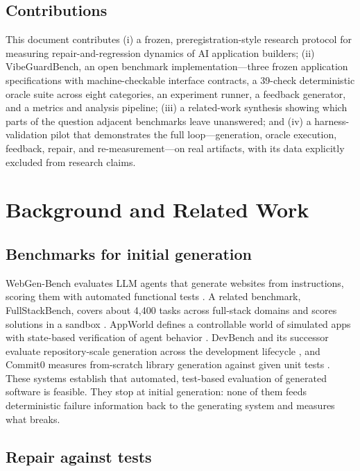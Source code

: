 \subsection{Contributions}

This document contributes (i) a frozen, preregistration-style research protocol for
measuring repair-and-regression dynamics of AI application builders; (ii) VibeGuardBench,
an open benchmark implementation---three frozen application specifications with
machine-checkable interface contracts, a 39-check deterministic oracle suite across
eight categories, an experiment runner, a feedback generator, and a metrics and
analysis pipeline; (iii) a related-work synthesis showing which parts of the question
adjacent benchmarks leave unanswered; and (iv) a harness-validation pilot that
demonstrates the full loop---generation, oracle execution, feedback, repair, and
re-measurement---on real artifacts, with its data explicitly excluded from research
claims.

\section{Background and Related Work}

\subsection{Benchmarks for initial generation}

WebGen-Bench evaluates LLM agents that generate websites from instructions, scoring
them with automated functional tests \cite{lu2025webgen}. A related benchmark,
FullStackBench, covers about
4{,}400 tasks across full-stack domains and scores solutions in a sandbox
\cite{byte2025fullstack}. AppWorld defines a controllable world of simulated apps
with state-based verification of agent behavior \cite{trivedi2024appworld}. DevBench
and its successor evaluate repository-scale generation across the development
lifecycle \cite{li2024devbench,kumarappan2026devbench}, and Commit0 measures
from-scratch library generation against given unit tests \cite{zhao2024commit0}.
These systems establish that automated, test-based evaluation of generated software
is feasible. They stop at initial generation: none of them feeds deterministic
failure information back to the generating system and measures what breaks.

\subsection{Repair against tests}

